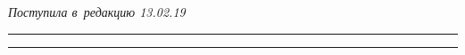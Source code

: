 \hfill{\small\textit{Поступила в~редакцию 13.02.19}}














\vspace*{8pt}





\hrule





\vspace*{2pt}















\hrule
















\def\tit{METHOD OF EXTRACTING EXPERTS' ASSESSMENTS FROM~SOCIAL NETWORKS 


IN~THE~GROUP DECISION MAKING PROCESS}





\def\titkol{Method of extracting experts' assessments from~social networks} 













\def\aut{O.\,V.~Chukhno$^1$, N.\,V.~Chukhno$^1$, 


Yu.\,V.~Gaidamaka$^{1,2}$, and~K.\,E.~Samouylov$^{1,2}$}





\def\autkol{O.\,V.~Chukhno, N.\,V.~Chukhno, 


Yu.\,V.~Gaidamaka, and~K.\,E.~Samouylov}











